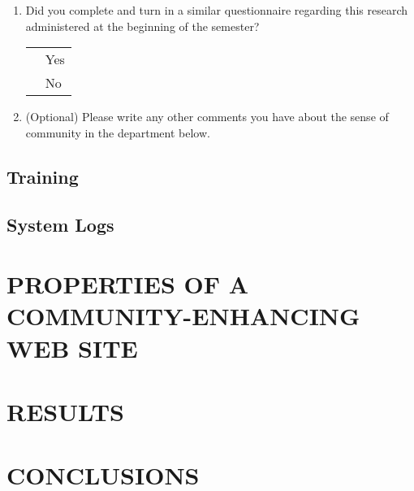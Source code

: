 \begin{enumerate}
\item{Did you complete and turn in a similar questionnaire regarding this
  research administered at the beginning of the semester?}\\
  \begin{tabular}{ll}
  \underline{  }\underline{  }\underline{  }  & Yes\\
  \underline{  }\underline{  }\underline{  }  & No\\
  \end{tabular}

\item{(Optional) Please write any other comments you have about the sense of
  community in the department below.}
\\ 
\end{enumerate}

\subsection{Training}


\subsection{System Logs}


\section{PROPERTIES OF A COMMUNITY-ENHANCING WEB SITE}



\section{RESULTS}



\section{CONCLUSIONS}






